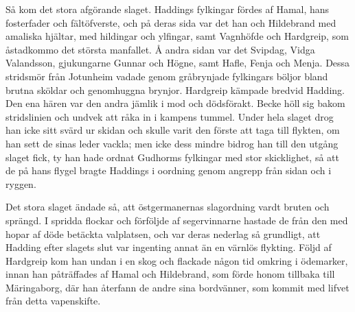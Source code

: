 Så kom det stora afgörande slaget. Haddings fylkingar fördes af Hamal,
hans fosterfader och fältöfverste, och på deras sida var det han och
Hildebrand med amaliska hjältar, med hildingar och ylfingar, samt
Vagnhöfde och Hardgreip, som åstadkommo det största manfallet. Å andra
sidan var det Svipdag, Vidga Valandsson, gjukungarne Gunnar och Högne,
samt Hafle, Fenja och Menja. Dessa stridsmör från Jotunheim vadade genom
gråbrynjade fylkingars böljor bland brutna sköldar och genomhuggna
brynjor. Hardgreip kämpade bredvid Hadding. Den ena hären var den andra
jämlik i mod och dödsförakt. Becke höll sig bakom stridslinien och
undvek att råka in i kampens tummel. Under hela slaget drog han icke
sitt svärd ur skidan och skulle varit den förste
\protect\hypertarget{lb1625905.xhtmlux5cux23start160}{}{}\protect\hypertarget{lb1625905.xhtmlux5cux23start160-a}{}{}\protect\hypertarget{lb1625905.xhtmlux5cux23start160-b}{}{}\protect\hypertarget{lb1625905.xhtmlux5cux23start160-c}{}{}\protect\hypertarget{lb1625905.xhtmlux5cux23start160-d}{}{}
att taga till flykten, om han sett de sinas leder vackla; men icke dess
mindre bidrog han till den utgång slaget fick, ty han hade ordnat
Gudhorms fylkingar med stor skicklighet, så att de på hans flygel bragte
Haddings i oordning genom angrepp från sidan och i ryggen.

Det stora slaget ändade så, att östgermanernas slagordning vardt bruten
och sprängd. I spridda flockar och förföljde af segervinnarne hastade de
från den med hopar af döde betäckta valplatsen, och var deras nederlag
så grundligt, att Hadding efter slagets slut var ingenting annat än en
värnlös flykting. Följd af Hardgreip kom han undan i en skog och
flackade någon tid omkring i ödemarker, innan han påträffades af Hamal
och Hildebrand, som förde honom tillbaka till Märingaborg, där han
återfann de andre sina bordvänner, som kommit med lifvet från detta
vapenskifte.

